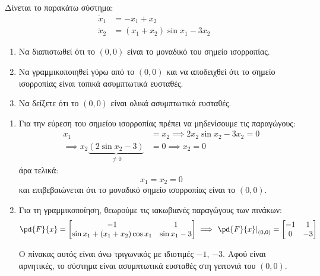\documentclass[11pt,a4paper,notitlepage,fleqn]{article}
\begin{document}
\begin{exercise}
	Δίνεται το παρακάτω σύστημα:
	\begin{align*}
        \dot x_1 &= -x_1 + x_2\\
        \dot x_2 &= (x_1+x_2)\sin x_1 - 3x_2
	\end{align*}
	
	\begin{enumerate}
		\item Να διαπιστωθεί ότι το \( (0,0) \) είναι το μοναδικό του σημείο ισορροπίας.
		\item Να γραμμικοποιηθεί γύρω από το \( (0,0) \) και να αποδειχθεί
		ότι το σημείο ισορροπίας είναι τοπικά ασυμπτωτικά ευσταθές.
		\item Να δείξετε ότι το \( (0,0) \) είναι ολικά ασυμπτωτικά ευσταθές.
	\end{enumerate}
\tcblower

    \begin{enumerate}
    	\item Για την εύρεση του σημείου ισορροπίας πρέπει να μηδενίσουμε
    	τις παραγώγους:
    	\begin{align*}
    		x_1 &= x_2 \implies 2x_2\sin x_2 - 3x_2 = 0\\
    		\implies x_2\underbrace{(2\sin x_2 - 3)}_{\neq 0} & = 0
    		\implies x_2 = 0
    	\end{align*}
    	άρα τελικά:
    	\[
    	x_1 = x_2 = 0
    	\]
    	και επιβεβαιώνεται ότι το μοναδικό σημείο ισορροπίας είναι το
    	\( (0,0) \).
    	
    	\item Για τη γραμμικοποίηση, θεωρούμε τις ιακωβιανές παραγώγους των πινάκων:
    	\begin{align*}
    		\pd{F}{x} = \left[\begin{matrix}
    		-1 & 1 \\ \sin x_1 + (x_1+x_2)\cos x_1 & \sin x_1 - 3
    		\end{matrix}\right]
    		\implies \left.\pd{F}{x} \right|_{(0,0)} = \left[\begin{matrix}
    		-1 & 1 \\ 0 & -3
    		\end{matrix}\right]
    	\end{align*}
    	
    	Ο πίνακας αυτός είναι άνω τριγωνικός με ιδιοτιμές \( -1 \), \( -3 \). Αφού είναι αρνητικές, το σύστημα είναι ασυμπτωτικά ευσταθές στη γειτονιά του \( (0,0) \).
    	

\end{enumerate}
\end{exercise}
\end{document}
